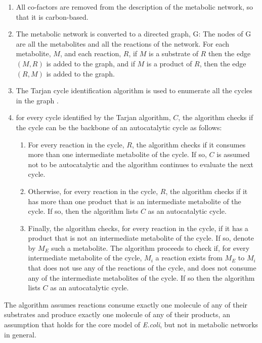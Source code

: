   \begin{enumerate}
    \item All co-factors are removed from the description of the metabolic network, so that it is carbon-based.
    \item The metabolic network is converted to a directed graph, G:
  The nodes of G are all the metabolites and all the reactions of the network.
  For each metabolite, $M$, and each reaction, $R$, if $M$ is a substrate of $R$ then the edge $(M,R)$ is added to the graph, and if $M$ is a product of $R$, then the edge $(R,M)$ is added to the graph.
    \item The Tarjan cycle identification algorithm is used to enumerate all the cycles in the graph \cite{Tarjan1973-gn}.
    \item for every cycle identified by the Tarjan algorithm, $C$, the algorithm checks if the cycle can be the backbone of an autocatalytic cycle as follows:
        \begin{enumerate}
            \item For every reaction in the cycle, $R$, the algorithm checks if it consumes more than one  intermediate metabolite of the cycle.
              If so, $C$ is assumed not to be autocatalytic and the algorithm continues to evaluate the next cycle.
            \item Otherwise, for every reaction in the cycle, $R$, the algorithm checks if it has more than one product that is an intermediate metabolite of the cycle.
              If so, then the algorithm lists $C$ as an autocatalytic cycle.
            \item Finally, the algorithm checks, for every reaction in the cycle, if it has a product that is not an intermediate metabolite of the cycle.
                If so, denote by $M_E$ such a metabolite.
            The algorithm proceeds to check if, for every intermediate metabolite of the cycle, $M_i$ a reaction exists from $M_E$ to $M_i$ that does not use any of the reactions of the cycle, and does not consume any of the intermediate metabolites of the cycle.
            If so then the algorithm lists $C$ as an autocatalytic cycle.
        \end{enumerate}
  \end{enumerate}

  The algorithm assumes reactions consume exactly one molecule of any of their substrates and produce exactly one molecule of any of their products, an assumption that holds for the core model of \emph{E.coli}, but not in metabolic networks in general.


